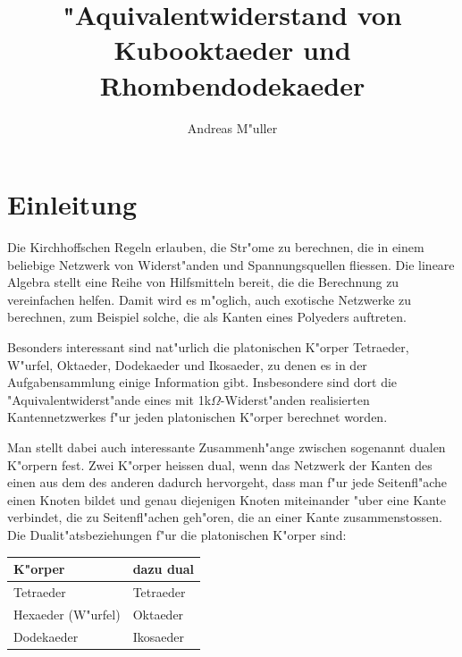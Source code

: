 \documentclass[a4paper,12pt]{article}
\begin{document}
\title{"Aquivalentwiderstand von Kubooktaeder und Rhombendodekaeder}
\author{Andreas M"uller}
\date{}
\maketitle
\section{Einleitung}
Die Kirchhoffschen Regeln erlauben, die Str"ome zu berechnen,
die in einem beliebige Netzwerk von Widerst"anden und Spannungsquellen fliessen.
Die lineare Algebra stellt eine Reihe von Hilfsmitteln bereit, die
die Berechnung zu vereinfachen helfen.
Damit wird es m"oglich, auch exotische Netzwerke zu berechnen, zum Beispiel
solche, die als Kanten eines Polyeders auftreten.

Besonders interessant sind nat"urlich die platonischen K"orper Tetraeder,
W"urfel, Oktaeder, Dodekaeder und Ikosaeder, zu denen es in der
Aufgabensammlung einige Information gibt.
Insbesondere sind dort die "Aquivalentwiderst"ande eines mit
1k$\Omega$-Widerst"anden realisierten Kantennetzwerkes f"ur jeden 
platonischen K"orper berechnet worden.

Man stellt dabei auch interessante Zusammenh"ange zwischen sogenannt dualen
K"orpern fest.
Zwei K"orper heissen dual, wenn das Netzwerk der Kanten des einen aus dem
des anderen dadurch hervorgeht, dass man f"ur jede Seitenfl"ache einen
Knoten bildet und genau diejenigen Knoten miteinander "uber eine Kante
verbindet, die zu Seitenfl"achen geh"oren, die an einer Kante zusammenstossen.
Die Dualit"atsbeziehungen f"ur die platonischen K"orper sind:
\begin{center}
\begin{tabular}{ll}
\hline
K"orper&dazu dual\\
\hline
Tetraeder&Tetraeder\\
Hexaeder (W"urfel)&Oktaeder\\
Dodekaeder&Ikosaeder\\
\hline
\end{tabular}
\end{center}
\end{document}
